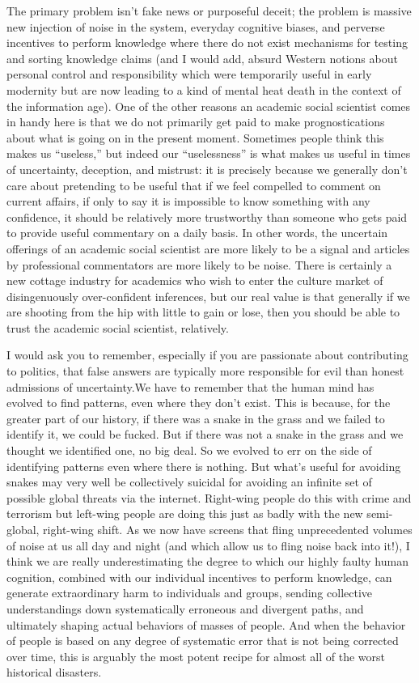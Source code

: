 \documentclass[a4paper,12pt,margin=.5in]{article}
\begin{document}
The primary problem isn't fake news or purposeful deceit; the problem is
massive new injection of noise in the system, everyday cognitive biases,
and perverse incentives to perform knowledge where there do not exist
mechanisms for testing and sorting knowledge claims (and I would add,
absurd Western notions about personal control and responsibility which
were temporarily useful in early modernity but are now leading to a kind
of mental heat death in the context of the information age). One of the
other reasons an academic social scientist comes in handy here is that
we do not primarily get paid to make prognostications about what is
going on in the present moment. Sometimes people think this makes us
``useless,'' but indeed our ``uselessness'' is what makes us useful in
times of uncertainty, deception, and mistrust: it is precisely because
we generally don't care about pretending to be useful that if we feel
compelled to comment on current affairs, if only to say it is impossible
to know something with any confidence, it should be relatively more
trustworthy than someone who gets paid to provide useful commentary on a
daily basis. In other words, the uncertain offerings of an academic
social scientist are more likely to be a signal and articles by
professional commentators are more likely to be noise. There is
certainly a new cottage industry for academics who wish to enter the
culture market of disingenuously over-confident inferences, but our real
value is that generally if we are shooting from the hip with little to
gain or lose, then you should be able to trust the academic social
scientist, relatively.

I would ask you to remember, especially if you are passionate about
contributing to politics, that false answers are typically more
responsible for evil than honest admissions of uncertainty.We have to
remember that the human mind has evolved to find patterns, even where
they don't exist. This is because, for the greater part of our history,
if there was a snake in the grass and we failed to identify it, we could
be fucked. But if there was not a snake in the grass and we thought we
identified one, no big deal. So we evolved to err on the side of
identifying patterns even where there is nothing. But what's useful for
avoiding snakes may very well be collectively suicidal for avoiding an
infinite set of possible global threats via the internet. Right-wing
people do this with crime and terrorism but left-wing people are doing
this just as badly with the new semi-global, right-wing shift. As we now
have screens that fling unprecedented volumes of noise at us all day and
night (and which allow us to fling noise back into it!), I think we are
really underestimating the degree to which our highly faulty human
cognition, combined with our individual incentives to perform knowledge,
can generate extraordinary harm to individuals and groups, sending
collective understandings down systematically erroneous and divergent
paths, and ultimately shaping actual behaviors of masses of people. And
when the behavior of people is based on any degree of systematic error
that is not being corrected over time, this is arguably the most potent
recipe for almost all of the worst historical disasters.
\end{document}
